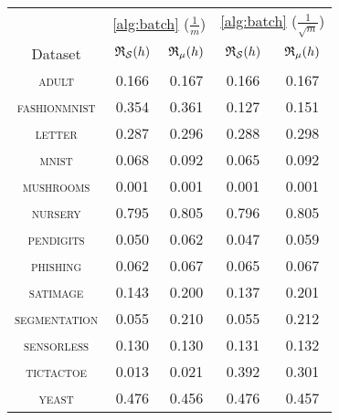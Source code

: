 \begin{tabular}{c|cc|cc}
\toprule
 & \multicolumn{2}{c}{\cref{alg:batch} {\small ($\frac{1}{m}$)}} & \multicolumn{2}{c}{\cref{alg:batch} {\small ($\frac{1}{\sqrt{m}}$)}} \\
Dataset & {\scriptsize $\mathfrak{R}_{\mathcal{S}}(h)$} & {\scriptsize $\mathfrak{R}_{\mu}(h)$} & {\scriptsize $\mathfrak{R}_{\mathcal{S}}(h)$} & {\scriptsize $\mathfrak{R}_{\mu}(h)$} \\
\midrule
\textsc{\footnotesize adult} & 0.166 & 0.167 & 0.166 & 0.167 \\
\textsc{\footnotesize fashionmnist} & 0.354 & 0.361 & 0.127 & 0.151 \\
\textsc{\footnotesize letter} & 0.287 & 0.296 & 0.288 & 0.298 \\
\textsc{\footnotesize mnist} & 0.068 & 0.092 & 0.065 & 0.092 \\
\textsc{\footnotesize mushrooms} & 0.001 & 0.001 & 0.001 & 0.001 \\
\textsc{\footnotesize nursery} & 0.795 & 0.805 & 0.796 & 0.805 \\
\textsc{\footnotesize pendigits} & 0.050 & 0.062 & 0.047 & 0.059 \\
\textsc{\footnotesize phishing} & 0.062 & 0.067 & 0.065 & 0.067 \\
\textsc{\footnotesize satimage} & 0.143 & 0.200 & 0.137 & 0.201 \\
\textsc{\footnotesize segmentation} & 0.055 & 0.210 & 0.055 & 0.212 \\
\textsc{\footnotesize sensorless} & 0.130 & 0.130 & 0.131 & 0.132 \\
\textsc{\footnotesize tictactoe} & 0.013 & 0.021 & 0.392 & 0.301 \\
\textsc{\footnotesize yeast} & 0.476 & 0.456 & 0.476 & 0.457 \\
\bottomrule
\end{tabular}

